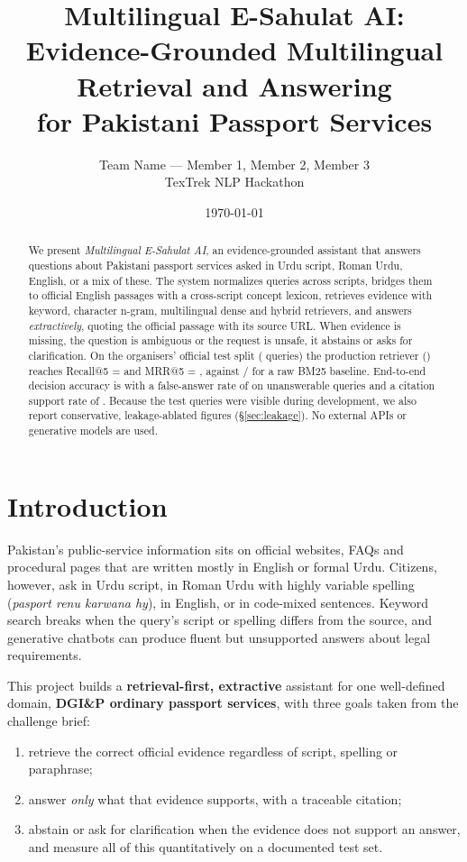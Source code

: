 \documentclass[12pt,a4paper]{article}
\title{Multilingual E-Sahulat AI:\\[2pt] \large Evidence-Grounded Multilingual Retrieval and Answering\\ for Pakistani Passport Services}
\author{Team Name --- Member 1, Member 2, Member 3\\ \small TexTrek NLP Hackathon}
\date{\today}
\begin{document}
\maketitle

\begin{abstract}
\noindent
We present \textit{Multilingual E-Sahulat AI}, an evidence-grounded assistant that answers questions about Pakistani
passport services asked in Urdu script, Roman Urdu, English, or a mix of these. The system normalizes queries across scripts,
bridges them to official English passages with a cross-script concept lexicon, retrieves evidence with keyword, character
n-gram, multilingual dense and hybrid retrievers, and answers \emph{extractively}, quoting the official passage with its
source URL. When evidence is missing, the question is ambiguous or the request is unsafe, it abstains or asks for
clarification. On the organisers' official test split (\RNTest{} queries) the production retriever (\RFinalMethod) reaches
Recall@5 = \RTestRecall{} \RTestRecallCI{} and MRR@5 = \RTestMRR{}, against \RBaseRecall{} / \RBaseMRR{} for a raw BM25 baseline.
End-to-end decision accuracy is \RDecAcc{} with a false-answer rate of \RFalseAns{} on unanswerable queries and a citation
support rate of \RCiteSupport{}. Because the test queries were visible during development, we also report conservative,
leakage-ablated figures (\S\ref{sec:leakage}). No external APIs or generative models are used.
\end{abstract}

\tableofcontents
\newpage

\section{Introduction}
Pakistan's public-service information sits on official websites, FAQs and procedural pages that are written mostly in
English or formal Urdu. Citizens, however, ask in Urdu script, in Roman Urdu with highly variable spelling
(\textit{pasport renu karwana hy}), in English, or in code-mixed sentences. Keyword search breaks when the query's script or
spelling differs from the source, and generative chatbots can produce fluent but unsupported answers about legal
requirements.

This project builds a \textbf{retrieval-first, extractive} assistant for one well-defined domain, \textbf{DGI\&P ordinary
passport services}, with three goals taken from the challenge brief:
\begin{enumerate}
  \item retrieve the correct official evidence regardless of script, spelling or paraphrase;
  \item answer \emph{only} what that evidence supports, with a traceable citation;
  \item abstain or ask for clarification when the evidence does not support an answer, and measure all of this
        quantitatively on a documented test set.
\end{enumerate}
\end{document}
